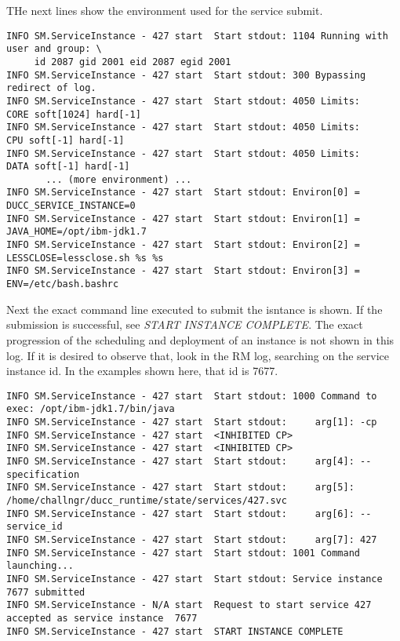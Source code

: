    THe next lines show the environment used for the service submit.  
\begin{verbatim}
INFO SM.ServiceInstance - 427 start  Start stdout: 1104 Running with user and group: \
     id 2087 gid 2001 eid 2087 egid 2001
INFO SM.ServiceInstance - 427 start  Start stdout: 300 Bypassing redirect of log.
INFO SM.ServiceInstance - 427 start  Start stdout: 4050 Limits:       CORE soft[1024] hard[-1]
INFO SM.ServiceInstance - 427 start  Start stdout: 4050 Limits:        CPU soft[-1] hard[-1]
INFO SM.ServiceInstance - 427 start  Start stdout: 4050 Limits:       DATA soft[-1] hard[-1]
       ... (more environment) ...
INFO SM.ServiceInstance - 427 start  Start stdout: Environ[0] = DUCC_SERVICE_INSTANCE=0
INFO SM.ServiceInstance - 427 start  Start stdout: Environ[1] = JAVA_HOME=/opt/ibm-jdk1.7
INFO SM.ServiceInstance - 427 start  Start stdout: Environ[2] = LESSCLOSE=lessclose.sh %s %s
INFO SM.ServiceInstance - 427 start  Start stdout: Environ[3] = ENV=/etc/bash.bashrc
\end{verbatim}

    Next the exact command line executed to submit the isntance is shown.  If the submission
    is successful, see {\em START INSTANCE COMPLETE}.  The exact progression of 
    the scheduling and deployment of an 
    instance is not shown in this log.  If it is desired to observe that, look in 
    the RM log, searching on the service instance id.  In the examples shown here, that
    id is 7677.

\begin{verbatim}
INFO SM.ServiceInstance - 427 start  Start stdout: 1000 Command to exec: /opt/ibm-jdk1.7/bin/java
INFO SM.ServiceInstance - 427 start  Start stdout:     arg[1]: -cp
INFO SM.ServiceInstance - 427 start  <INHIBITED CP>
INFO SM.ServiceInstance - 427 start  <INHIBITED CP>
INFO SM.ServiceInstance - 427 start  Start stdout:     arg[4]: --specification
INFO SM.ServiceInstance - 427 start  Start stdout:     arg[5]: /home/challngr/ducc_runtime/state/services/427.svc
INFO SM.ServiceInstance - 427 start  Start stdout:     arg[6]: --service_id
INFO SM.ServiceInstance - 427 start  Start stdout:     arg[7]: 427
INFO SM.ServiceInstance - 427 start  Start stdout: 1001 Command launching...
INFO SM.ServiceInstance - 427 start  Start stdout: Service instance 7677 submitted
INFO SM.ServiceInstance - N/A start  Request to start service 427 accepted as service instance  7677
INFO SM.ServiceInstance - 427 start  START INSTANCE COMPLETE
\end{verbatim}

